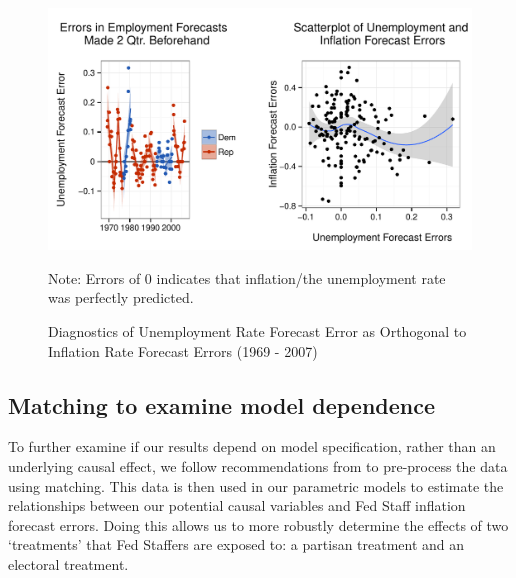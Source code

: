 \documentclass[a4paper]{article}
\newenvironment{knitrout}{}{} %
\begin{document}
\begin{figure}[t]
    \caption{Diagnostics of Unemployment Rate Forecast Error as Orthogonal to Inflation Rate Forecast Errors (1969 - 2007)}
    \label{Unemployment}
    \begin{center}
    
\begin{knitrout}
\color{fgcolor}

{\centering \includegraphics[width=0.95\linewidth]{figure/GraphPartisanErrorUnemploy} 

}



\end{knitrout}


    \end{center}
    \begin{singlespace}
        {\scriptsize{Note: Errors of 0 indicates that inflation/the unemployment rate was perfectly predicted.}}
    \end{singlespace}
\end{figure}

\subsection*{Matching to examine model dependence}

To further examine if our results depend on model specification, rather than an underlying causal effect, we follow recommendations from \cite{Ho2007} to pre-process the data using matching. This data is then used in our parametric models to estimate the relationships between our potential causal variables and Fed Staff inflation forecast errors. Doing this allows us to more robustly determine the effects of two `treatments' that Fed Staffers are exposed to: a partisan treatment and an electoral treatment. 
\end{document}
